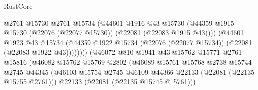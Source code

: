 \begin{lexlean}{RustCore}
\begin{coremodule}
                                            @2761
                                            @15730
                                            @2761
                                            @15734
                                            (@44601
                                              @1916
                                              @43
                                              @15730
                                              (@44359
                                                @1915
                                                @15730
                                                (@22076 (@22077 @15730))
                                                (@22081 (@22083 @1915 @43))))
                                            (@44601
                                              @1923
                                              @43
                                              @15734
                                              (@44359
                                                @1922
                                                @15734
                                                (@22076 (@22077 @15734))
                                                (@22081 (@22083 @1922 @43))))))))
                                    (@46072
                                      @810
                                      @1941
                                      @43
                                      @15762
                                      @15771
                                      @2761
                                      @15816
                                      (@46082
                                        @15762
                                        @15769
                                        @2802
                                        (@46089
                                          @15761
                                          @15768
                                          @2738
                                          @15744
                                          @2745
                                          @44345
                                          (@46103
                                            @15754
                                            @2745
                                            @46109
                                            @44366
                                            @22133
                                            (@22081 (@22135 @15755 @2761)))
                                          @22133
                                          (@22081 (@22135 @15745 @15761)))

\end{coremodule}
\end{lexlean}
